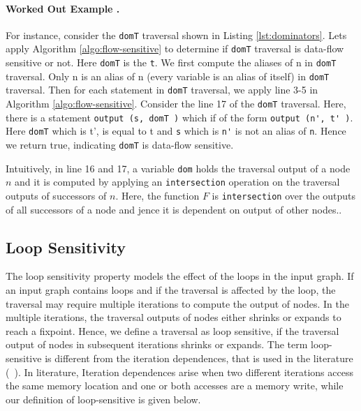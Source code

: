 \paragraph{Worked Out Example .}
For instance, consider the \lstinline|domT| traversal shown in Listing \ref{lst:dominators}. Lets apply Algorithm \ref{algo:flow-sensitive} to determine if \lstinline|domT| traversal is data-flow sensitive or not. Here \lstinline|domT| is the \lstinline|t|. We first compute the aliases of n in \lstinline|domT| traversal. Only n is an alias of n (every variable is an alias of itself) in \lstinline|domT| traversal. Then for each statement in \lstinline|domT| traversal, we apply line 3-5 in Algorithm \ref{algo:flow-sensitive}. Consider the line 17 of the \lstinline|domT| traversal. Here, there is a statement \lstinline|output (s, domT )| which if of the form \lstinline|output (n', t' )|. Here \lstinline|domT| which is t', is equal to t and \lstinline|s| which is \lstinline|n'| is not an alias of \lstinline|n|. Hence we return true, indicating \lstinline|domT| is data-flow sensitive.

Intuitively, in line 16 and 17, a variable \lstinline|dom| holds
the traversal output of a node $n$ and it is computed by applying an
\lstinline|intersection| operation on the traversal outputs of successors of
$n$. Here, the function $F$ is \lstinline|intersection| over the outputs of all
successors of a node and jence it is dependent on output of other nodes..

\subsection{Loop Sensitivity}
The loop sensitivity property models the effect of the loops in the input graph.
If an input graph contains loops and if the traversal is affected by the loop,
the traversal may require multiple iterations to compute the output of nodes.
In the multiple iterations, the traversal outputs of nodes either shrinks or
expands to reach a fixpoint. Hence, we define a traversal as loop sensitive,
if the traversal output of nodes in subsequent iterations shrinks or expands. The term loop-sensitive is different from the iteration dependences, that is used in the literature (~\cite{blume1996parallel}). In literature, Iteration dependences arise when two different iterations access the same memory location and one or both
accesses are a memory write, while our definition of loop-sensitive is given below.

